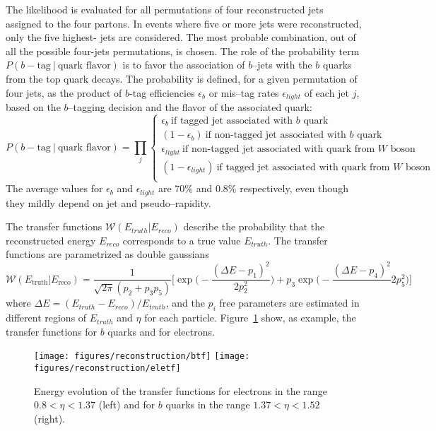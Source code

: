 The likelihood is evaluated for all permutations of four reconstructed
jets assigned to the four partons.
In events where five or more jets were reconstructed, only
the five highest-\pt{} jets are considered. The most probable
combination, out of all the possible four-jets permutations, is
chosen. The role of the probability term $P(b-\textrm{tag} ~|
~\textrm{quark flavor})$ is to favor the association of $b$--jets with
the $b$ quarks from the top quark decays. The probability is defined,
for a given permutation of four jets, as the product of $b$-tag
efficiencies $\epsilon_b$ or mis--tag rates $\epsilon_{light}$ of each
jet $j$, based on the $b$--tagging decision and the flavor of the
associated quark:
\begin{equation}
P(b-\textrm{tag}~|~\textrm{quark flavor}) = \prod_{j}
\begin{cases}
\epsilon_b~\text{if tagged jet associated with $b$ quark}\\
(1-\epsilon_b)~\text{if non-tagged jet associated with $b$ quark} \\
\epsilon_{light}~\text{if non-tagged jet associated with quark from
  $W$ boson} \\
(1-\epsilon_{light})~\text{if tagged jet associated with quark from
  $W$ boson} \\
\end{cases}
\end{equation} 
The average values for $\epsilon_b$ and $\epsilon_{light}$ are $70\%$
and $0.8\%$ respectively, even though they mildly depend on
jet \pt{} and pseudo--rapidity. 

The transfer functions $\mathcal{W}(E_{truth}|E_{reco})$ describe the probability that the
reconstructed energy $E_{reco}$ corresponds to a true value
$E_{truth}$.
The transfer functions are parametrized as double gaussians
\begin{equation}
  \label{eq:doublegaus}
  \mathcal{W}(E_\mathrm{truth}|E_\mathrm{reco}) = \frac{1}{\sqrt{2\pi}(p_2+p_3p_5)}\Bigg[ \exp\Bigg(-\frac{(\Delta E - p_1)^2}{2p_2^2}\Bigg) + p_3\exp\Bigg(-\frac{(\Delta E - p_4)^2}\
  {2p_5^2}\Bigg) \Bigg]\phantom{,}
\end{equation}
where $\Delta E = (E_{truth}-E_{reco})/E_{truth}$, and the $p_i$
free parameters are estimated in different regions of $E_{truth}$ and
$\eta$ for each particle. Figure~\ref{fig:transferfunctions} show, as
example, the transfer functions for $b$ quarks and for electrons.  

\begin{figure}[!htb]\centering
  \texttt{[image: figures/reconstruction/btf]}
  \texttt{[image: figures/reconstruction/eletf]}
  \caption[Energy evolution of transfer functions]{
    Energy evolution of the transfer functions for electrons in the
    range $0.8<\eta<1.37$ (left) and for $b$ quarks in the range
    $1.37<\eta<1.52$ (right). 
    \label{fig:transferfunctions}
    }
\end{figure}

